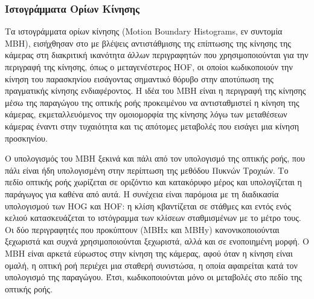 \documentclass[11pt,a4paper,english,greek,twoside]{../Thesis}
\begin{document}
\subsubsection{Ιστογράμματα Ορίων Κίνησης}
Τα ιστογράμματα ορίων κίνησης (Motion Boundary Histograms, εν συντομία MBH), εισήχθησαν στο \cite{dalal_2006} με βλέψεις αντιστάθμισης της επίπτωσης της κίνησης της κάμερας στη διακριτική ικανότητα άλλων περιγραφητών που χρησιμοποιούνται για την περιγραφή της κίνησης, όπως ο μεταγενέστερος HOF, οι οποίοι κωδικοποιούν την κίνηση του παρασκηνίου εισάγοντας σημαντικό θόρυβο στην αποτύπωση της πραγματικής κίνησης ενδιαφέροντος. Η ιδέα του MBH είναι η περιγραφή της κίνησης μέσω της παραγώγου της οπτικής ροής προκειμένου να αντισταθμιστεί η κίνηση της κάμερας, εκμεταλλευόμενος την ομοιομορφία της κίνησης λόγω των μεταθέσεων κάμερας έναντι στην τυχαιότητα και τις απότομες μεταβολές που εισάγει μια κίνηση προσκηνίου.

\par Ο υπολογισμός του MBH ξεκινά και πάλι από τον υπολογισμό της οπτικής ροής, που πάλι είναι ήδη υπολογισμένη στην περίπτωση της μεθόδου Πυκνών Τροχιών. Το πεδίο οπτικής ροής χωρίζεται σε οριζόντιο και κατακόρυφο μέρος και υπολογίζεται η παράγωγος για καθένα από αυτά. Η συνέχεια είναι παρόμοια με τη διαδικασία υπολογισμού των HΟG και HOF: η κλίση κβαντίζεται σε στάθμες και εντός ενός κελιού κατασκευάζεται το ιστόγραμμα των κλίσεων σταθμισμένων με το μέτρο τους. Οι δύο περιγραφητές που προκύπτουν (MBHx και ΜΒΗy) κανονικοποιούνται ξεχωριστά και συχνά χρησιμοποιούνται ξεχωριστά, αλλά και σε ενοποιημένη μορφή. Ο MBH είναι αρκετά εύρωστος στην κίνηση της κάμερας, αφού όταν η κίνηση είναι ομαλή, η οπτική ροή περιέχει μια σταθερή συνιστώσα, η οποία αφαιρείται κατά τον υπολογισμό της παραγώγου. Έτσι, κωδικοποιούνται μόνο οι μεταβολές στο πεδίο της οπτικής ροής.


\end{document}
